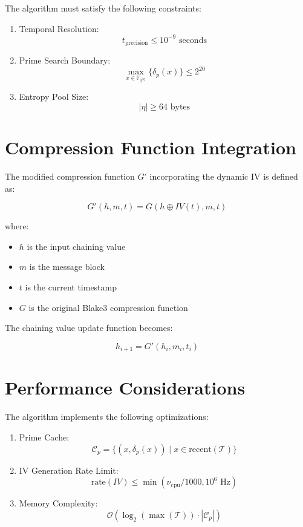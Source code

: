 \documentclass{article}
\begin{document}
The algorithm must satisfy the following constraints:

\begin{enumerate}
  \item Temporal Resolution:
  \[
  t_{\text{precision}} \leq 10^{-9} \text{ seconds}
  \]
  \item Prime Search Boundary:
  \[
  \max_{x \in \mathbb{F}_{2^{32}}} \{\delta_p(x)\} \leq 2^{20}
  \]
  \item Entropy Pool Size:
  \[
  |\eta| \geq 64 \text{ bytes}
  \]
\end{enumerate}

\section{Compression Function Integration}

The modified compression function $G'$ incorporating the dynamic IV is defined as:

\[
G'(h, m, t) = G(h \oplus IV(t), m, t)
\]

where:
\begin{itemize}
  \item $h$ is the input chaining value
  \item $m$ is the message block
  \item $t$ is the current timestamp
  \item $G$ is the original Blake3 compression function
\end{itemize}

The chaining value update function becomes:

\[
h_{i+1} = G'(h_i, m_i, t_i)
\]

\section{Performance Considerations}

The algorithm implements the following optimizations:

\begin{enumerate}
  \item Prime Cache:
  \[
  \mathcal{C}_p = \{(x, \delta_p(x)) \mid x \in \text{recent}(\mathcal{T})\}
  \]
  \item IV Generation Rate Limit:
  \[
  \text{rate}(IV) \leq \min(\nu_{\text{cpu}}/1000, 10^6 \text{ Hz})
  \]
  \item Memory Complexity:
  \[
  \mathcal{O}(\log_2(\max(\mathcal{T})) \cdot |\mathcal{C}_p|)
  \]
\end{enumerate}
\end{document}
